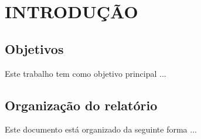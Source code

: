 \chapter{INTRODUÇÃO}
\label{chap:intro}



\section{Objetivos}
\label{sec:obj}
Este trabalho tem como objetivo principal ...


\section{Organização do relatório}
\label{sec:org}
Este documento está organizado da seguinte forma ...
